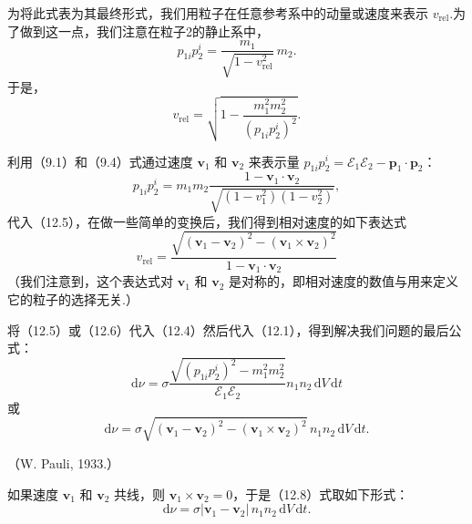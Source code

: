 为将此式表为其最终形式，我们用粒子在任意参考系中的动量或速度来表示 $v_{\mathrm{rel}}$.为了做到这一点，我们注意在粒子2的静止系中，
\begin{equation*}
  p_{1i}p_2^i=\frac{m_1}{\sqrt{1-v_{\mathrm{rel}}^2}}\,m_2.
\end{equation*}
于是，
\begin{equation}
  v_{\mathrm{rel}}=\sqrt{1-\frac{m_1^2m_2^2}{(p_{1i}p_2^i)^2}}.
\end{equation}

利用（9.1）和（9.4）式通过速度 $\boldsymbol{v}_1$ 和 $\boldsymbol{v}_2$ 来表示量 $p_{1i}p_2^i=\mathcal{E}_1\mathcal{E}_2-\boldsymbol{p}_1\cdot\boldsymbol{p}_2$：
\begin{equation*}
  p_{1i}p_2^i=m_1m_2
  \frac{1-\boldsymbol{v}_1\cdot\boldsymbol{v}_2}
  {\sqrt{(1-v_1^2)(1-v_2^2)}},
\end{equation*}
代入（12.5），在做一些简单的变换后，我们得到相对速度的如下表达式
\begin{equation}
  v_{\mathrm{rel}}=\frac{\sqrt{(\boldsymbol{v}_1-\boldsymbol{v}_2)^2
  -(\boldsymbol{v}_1\times\boldsymbol{v}_2)^2}}{1-\boldsymbol{v}_1\cdot\boldsymbol{v}_2}
\end{equation}
（我们注意到，这个表达式对 $\boldsymbol{v}_1$ 和 $\boldsymbol{v}_2$ 是对称的，即相对速度的数值与用来定义它的粒子的选择无关.）

将（12.5）或（12.6）代入（12.4）然后代入（12.1），得到解决我们问题的最后公式：
\begin{equation}
  \mathrm{d}\nu=\sigma
  \frac{\sqrt{(p_{1i}p_2^i)^2-m_1^2m_2^2}}{\mathcal{E}_1\mathcal{E}_2}
  n_1n_2\,\mathrm{d}V\,\mathrm{d}t
\end{equation}
或
\begin{equation}
  \mathrm{d}\nu=\sigma\sqrt{(\boldsymbol{v}_1-\boldsymbol{v}_2)^2
  -(\boldsymbol{v}_1\times\boldsymbol{v}_2)^2}\,n_1n_2\,\mathrm{d}V\,\mathrm{d}t.
\end{equation}

（W. Pauli, 1933.）

如果速度 $\boldsymbol{v}_1$ 和 $\boldsymbol{v}_2$ 共线，则 $\boldsymbol{v}_1\times\boldsymbol{v}_2=0$，于是（12.8）式取如下形式：
\begin{equation}
  \mathrm{d}\nu=\sigma|\boldsymbol{v}_1-\boldsymbol{v}_2|\,
  n_1n_2\,\mathrm{d}V\,\mathrm{d}t.
\end{equation}

